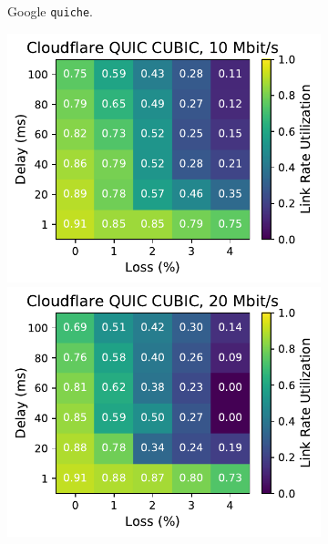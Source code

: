 \begin{figure}[ht]
\begin{subfigure}[b]{0.22\linewidth}
        \caption{Google \texttt{quiche}.}
    \end{subfigure}
    \begin{subfigure}[b]{0.22\linewidth}
        \includegraphics[width=\linewidth,trim={0 0 2cm 0},clip]{figures/heatmaps/heatmap_quiche_cubic_10mbps.pdf}
        \includegraphics[width=\linewidth,trim={0 0 2cm 0},clip]{figures/heatmaps/heatmap_quiche_cubic_20mbps.pdf}

\end{subfigure}
\end{figure}
